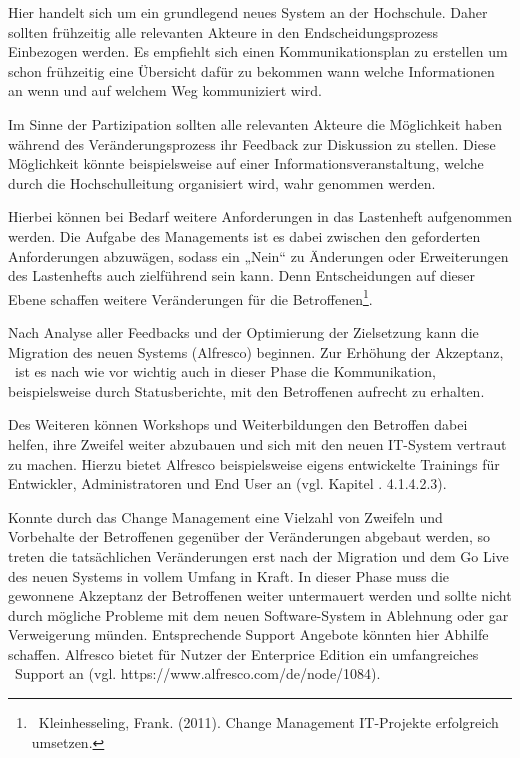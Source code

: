 \documentclass{article}
\begin{document}
Hier handelt sich um ein grundlegend neues System an der Hochschule. Daher sollten frühzeitig alle relevanten Akteure in
den Endscheidungsprozess Einbezogen werden. Es empfiehlt sich einen Kommunikationsplan zu erstellen um schon frühzeitig
eine Übersicht dafür zu bekommen wann welche Informationen an wenn und auf welchem Weg kommuniziert wird. 


\bigskip

Im Sinne der Partizipation sollten alle relevanten Akteure die Möglichkeit haben während des Veränderungsprozess ihr
Feedback zur Diskussion zu stellen. Diese Möglichkeit könnte beispielsweise auf einer Informationsveranstaltung, welche
durch die Hochschulleitung organisiert wird, wahr genommen werden. 


\bigskip

Hierbei können bei Bedarf weitere Anforderungen in das Lastenheft aufgenommen werden. Die Aufgabe des Managements ist es
dabei zwischen den geforderten Anforderungen abzuwägen, sodass ein „Nein“ zu Änderungen oder Erweiterungen des
Lastenhefts auch zielführend sein kann. Denn Entscheidungen auf dieser Ebene schaffen weitere Veränderungen für die
Betroffenen\footnote{\ Kleinhesseling, Frank. (2011). Change Management IT-Projekte erfolgreich umsetzen.}. 


\bigskip

Nach Analyse aller Feedbacks und der Optimierung der Zielsetzung kann die Migration des neuen Systems (Alfresco)
beginnen. Zur Erhöhung der Akzeptanz, \ ist es nach wie vor wichtig auch in dieser Phase die Kommunikation,
beispielsweise durch Statusberichte, mit den Betroffenen aufrecht zu erhalten. \ 


\bigskip

Des Weiteren können Workshops und Weiterbildungen den Betroffen dabei helfen, ihre Zweifel weiter abzubauen und sich mit
den neuen IT-System vertraut zu machen. Hierzu bietet Alfresco beispielsweise eigens entwickelte Trainings für
Entwickler, Administratoren und End User an (vgl. Kapitel . 4.1.4.2.3).


\bigskip

Konnte durch das Change Management eine Vielzahl von Zweifeln und Vorbehalte der Betroffenen gegenüber der Veränderungen
abgebaut werden, so treten die tatsächlichen Veränderungen erst nach der Migration und dem Go Live des neuen Systems in
vollem Umfang in Kraft. In dieser Phase muss die gewonnene Akzeptanz der Betroffenen weiter untermauert werden und
sollte nicht durch mögliche Probleme mit dem neuen Software-System in Ablehnung oder gar Verweigerung münden.
Entsprechende Support Angebote könnten hier Abhilfe schaffen. Alfresco bietet für Nutzer der Enterprice Edition ein
umfangreiches \ Support an (vgl. https://www.alfresco.com/de/node/1084). 
\end{document}
